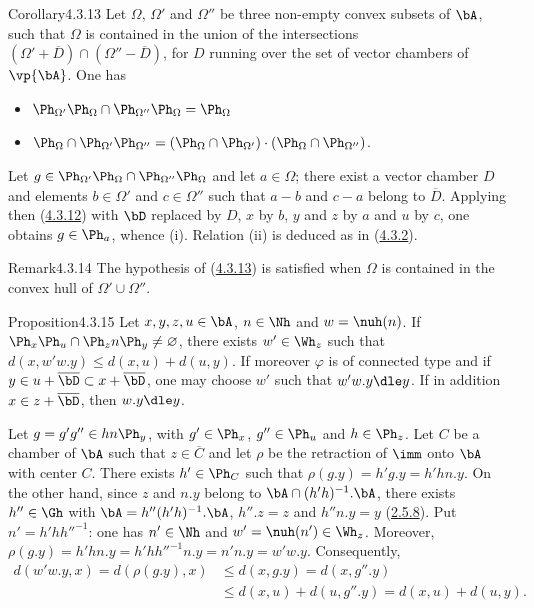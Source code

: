 \documentclass[12pt,a4paper,oneside,english]{smfart}
\makeatletter
\newcommand{\btanchor}[1]{\leavevmode\Hy@raisedlink{\hypertarget{bt:#1}{}}}
\newcommand{\btref}[1]{\hyperlink{bt:#1}{#1}}
\theoremstyle{definition}
\theoremstyle{bt}
\makeatother
\begin{document}
\begin{state}{Corollary}{4.3.13}\btanchor{4.3.13}
Let $\Omega$, $\Omega'$ and $\Omega''$ be three non-empty convex subsets of
$\bA$, such that $\Omega$ is contained in the union of the intersections
$(\Omega'+\overline{D})\cap(\Omega''-\overline{D})$, for $D$ running over the
set of vector chambers of $\vp{\bA}$. One has
\begin{itemize}
\item[(i)] $\Ph_{\Omega'}\Ph_{\Omega}\cap\Ph_{\Omega''}\Ph_{\Omega}
             = \Ph_{\Omega}$
\item[(ii)] $\Ph_{\Omega}\cap\Ph_{\Omega'}\Ph_{\Omega''}
             = (\Ph_{\Omega}\cap\Ph_{\Omega'})\cdot
               (\Ph_{\Omega}\cap\Ph_{\Omega''})$.
\end{itemize}
\end{state}

Let $g\in\Ph_{\Omega'}\Ph_{\Omega}\cap\Ph_{\Omega''}\Ph_{\Omega}$ and let
$a\in\Omega$; there exist a vector chamber $D$ and elements $b\in\Omega'$ and
$c\in\Omega''$ such that $a-b$ and $c-a$ belong to $\overline{D}$. Applying
then (\btref{4.3.12}) with $\bD$ replaced by $D$, $x$ by $b$, $y$ and $z$ by $a$ and
$u$ by $c$, one obtains $g\in\Ph_{a}$, whence (i). Relation (ii) is deduced
as in (\btref{4.3.2}).

\begin{state}{Remark}{4.3.14}\btanchor{4.3.14}
\upshape
The hypothesis of (\btref{4.3.13}) is satisfied when $\Omega$ is contained in the
convex hull of $\Omega'\cup\Omega''$.
\end{state}

\begin{state}{Proposition}{4.3.15}\btanchor{4.3.15}
Let $x,y,z,u\in\bA$, $n\in\Nh$ and $w = \nuh(n)$. If
$\Ph_{x}\Ph_{u}\cap\Ph_{z}n\Ph_{y} \neq \varnothing$, there exists
$w'\in\Wh_{z}$ such that $d(x, w'w.y) \leqslant d(x,u)+d(u,y)$. If moreover
$\varphi$ is of connected type and if
$y \in u+\overline{\bD} \subset x+\overline{\bD}$, one may choose $w'$ such
that $w'w.y \dle y$. If in addition $x \in z+\overline{\bD}$, then
$w.y \dle y$.
\end{state}

Let $g = g'g'' \in hn\Ph_{y}$, with $g'\in\Ph_{x}$, $g''\in\Ph_{u}$ and
$h\in\Ph_{z}$. Let $C$ be a chamber of $\bA$ such that $z\in\overline{C}$ and
let $\rho$ be the retraction of $\imm$ onto $\bA$ with center $C$. There
exists $h'\in\Ph_{C}$ such that $\rho(g.y) = h'g.y = h'hn.y$. On the other
hand, since $z$ and $n.y$ belong to $\bA\cap(h'h)^{-1}.\bA$, there exists
$h''\in\Gh$ with $\bA = h''(h'h)^{-1}.\bA$, $h''.z = z$ and $h''n.y = y$
(\btref{2.5.8}). Put $n' = h'hh''^{-1}$: one has $n'\in\Nh$ and
$w' = \nuh(n')\in\Wh_{z}$. Moreover,
$\rho(g.y) = h'hn.y = h'hh''^{-1}n.y = n'n.y = w'w.y$. Consequently,
\begin{align*}
d(w'w.y, x) = d(\rho(g.y), x) &\leqslant d(x, g.y) = d(x, g''.y)\\
 &\leqslant d(x,u)+d(u, g''.y) = d(x,u)+d(u,y).
\end{align*}
\end{document}
